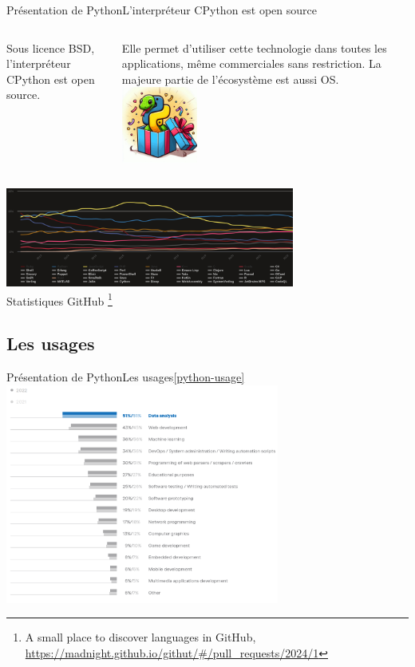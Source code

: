 \documentclass{beamer}
\begin{document}
    \begin{frame}{Présentation de Python}{L'interpréteur CPython est open source}
        \begin{columns}
            Sous licence BSD, l'interpréteur CPython est open source.

            Elle permet d'utiliser cette technologie dans toutes les applications, même commerciales sans restriction.
            \bigbreak
            La majeure partie de l'écosystème est aussi OS.
            \centering
            \includegraphics[width=2.5cm]{image/python-gift}
        \end{columns}
        \bigbreak
        \centering
        \includegraphics[width=9.5cm]{image/github-stats} \\ Statistiques GitHub \footnote{A small place to discover languages in GitHub, \url{https://madnight.github.io/githut/\#/pull_requests/2024/1}} \\
    \end{frame}

    \subsection{Les usages}\label{subsec:usages}

    \begin{frame}{Présentation de Python}{Les usages\cref{python-usage}}
        \centering
        \includegraphics[width=9cm]{image/survey-usage}
    \end{frame}
\end{document}
